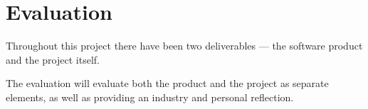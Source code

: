 \chapter{Evaluation}
\label{cha:evaluation}

Throughout this project there have been two deliverables --- the software 
product and the project itself.

The evaluation will evaluate both the product and the project as separate 
elements, as well as providing an industry and personal reflection.

\newpage


\newpage


\newpage


\newpage
